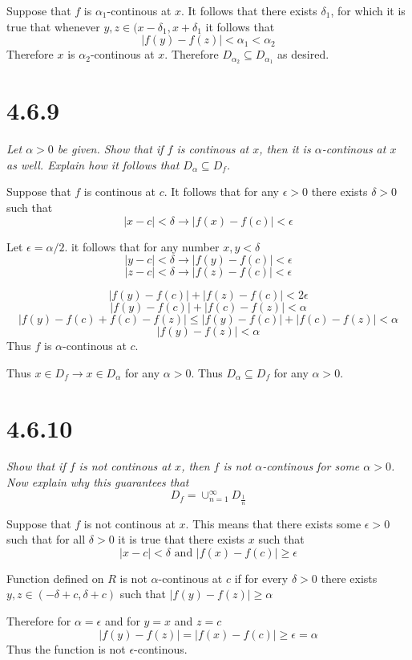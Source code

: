 \documentclass[11pt,oneside,titlepage]{book}
\begin{document}
Suppose that $f$ is $\alpha_1$-continous at $x$. It follows that there exists
$\delta_1$, for which it is true that whenever
$y, z \in (x - \delta_1, x + \delta_1$ it follows that 
$$|f(y) - f(z)| < \alpha_1 < \alpha_2$$
Therefore $x$ is $\alpha_2$-continous at $x$. Therefore
$D_{\alpha_2} \subseteq D_{\alpha_1}$
as desired.

\section*{4.6.9}
\textit{Let $\alpha > 0$ be given. Show that if $f$ is continous at $x$, then
  it is $\alpha$-continous at $x$ as well. Explain how it follows that
  $D_\alpha \subseteq D_f$.}

Suppose that $f$ is continous at $c$. It follows that for any $\epsilon > 0$
there exists $\delta > 0$ such that 
$$|x - c| < \delta \to |f(x) - f(c)| < \epsilon$$

Let $\epsilon = \alpha / 2$. it follows that for any number $x, y < \delta$
$$|y - c| < \delta \to |f(y) - f(c)| < \epsilon$$
$$|z - c| < \delta \to |f(z) - f(c)| < \epsilon$$


$$|f(y) - f(c)| + |f(z) - f(c)| < 2\epsilon$$
$$|f(y) - f(c)| + |f(c) - f(z)| < \alpha$$
$$|f(y) - f(c) + f(c) - f(z)| \leq |f(y) - f(c)| + |f(c) - f(z)| < \alpha$$
$$|f(y)  - f(z)|  < \alpha$$
Thus $f$ is $\alpha$-continous at $c$.

Thus $x \in D_f \to x \in D_\alpha$ for any $\alpha > 0$. Thus
$D_\alpha \subseteq D_f$ for any $\alpha > 0$.

\section*{4.6.10}
\textit{Show that if $f$ is not continous at $x$, then $f$ is not
  $\alpha$-continous for some $\alpha > 0$. Now explain why this guarantees
  that}
$$D_f = \cup_{n = 1}^{\infty}D_{\frac 1 n }$$

Suppose that $f$ is not continous at $x$. This means that there exists some
$\epsilon > 0$ such that for all $\delta > 0$ it is true that
there exists $x$ such that 
$$|x - c| < \delta \text{ and } |f(x) - f(c)| \geq \epsilon$$


Function defined on $R$ is not $\alpha$-continous at $c$
if for every $\delta > 0$ there exists
$y, z \in (-\delta + c, \delta + c)$ such that 
$|f(y) - f(z)| \geq \alpha$

Therefore for $\alpha = \epsilon$ and for $y = x$ and $z = c$
$$|f(y) - f(z)| = |f(x) - f(c)|  \geq \epsilon =  \alpha$$
Thus the function is not $\epsilon$-continous.
\end{document}
